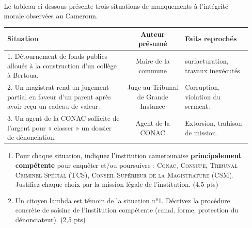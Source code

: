 \documentclass[11pt]{article}
\begin{document}
\begin{exercice}
Le tableau ci-dessous présente trois situations de manquements à l'intégrité morale observées au Cameroun.
\begin{center}
\begin{tabularx}{\linewidth}{|X|c|X|}
\hline
\textbf{Situation} & \textbf{Auteur présumé} & \textbf{Faits reprochés} \\
\hline
1. Détournement de fonds publics alloués à la construction d'un collège à Bertoua. & Maire de la commune & surfacturation, travaux inexécutés. \\
\hline
2. Un magistrat rend un jugement partial en faveur d'un parent après avoir reçu un cadeau de valeur. & Juge au Tribunal de Grande Instance & Corruption, violation du serment. \\
\hline
3. Un agent de la CONAC sollicite de l'argent pour « classer » un dossier de dénonciation. & Agent de la CONAC & Extorsion, trahison de mission. \\
\hline
\end{tabularx}
\end{center}
\begin{enumerate}
    \item Pour chaque situation, indiquez l'institution camerounaise \textbf{principalement compétente} pour enquêter et/ou poursuivre : \textsc{Conac}, \textsc{Consupe}, \textsc{Tribunal Criminel Spécial (TCS)}, \textsc{Conseil Supérieur de la Magistrature (CSM)}. Justifiez chaque choix par la mission légale de l'institution. (4,5 pts)
    \item Un citoyen lambda est témoin de la situation n°1. Décrivez la procédure concrète de saisine de l'institution compétente (canal, forme, protection du dénonciateur). (2,5 pts)
\end{enumerate}
\end{exercice}
\end{document}

